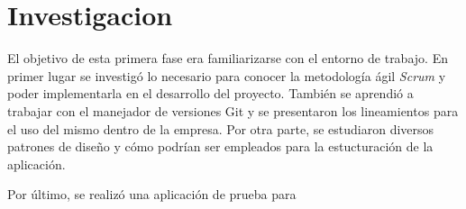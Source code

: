 \section{Investigacion} \label{sect:Investigacion}

El objetivo de esta primera fase era familiarizarse con el entorno de trabajo. En primer lugar se investigó lo necesario para conocer la metodología ágil \textit{Scrum} y poder implementarla en el desarrollo del proyecto. También se aprendió a trabajar con el manejador de versiones Git y se presentaron los lineamientos para el uso del mismo dentro de la empresa. Por otra parte, se estudiaron diversos patrones de diseño y cómo podrían ser empleados para la estucturación de la aplicación.

Por último, se realizó una aplicación de prueba para 


